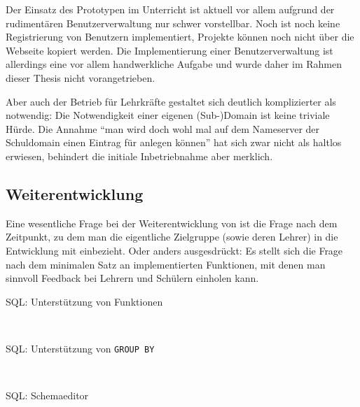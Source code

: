 Der Einsatz des Prototypen im Unterricht ist aktuell vor allem aufgrund der rudimentären Benutzerverwaltung nur schwer vorstellbar. Noch ist noch keine Registrierung von Benutzern implementiert, Projekte können noch nicht über die Webseite kopiert werden. Die Implementierung einer Benutzerverwaltung ist allerdings eine vor allem handwerkliche Aufgabe und wurde daher im Rahmen dieser Thesis nicht vorangetrieben.

Aber auch der Betrieb für Lehrkräfte gestaltet sich deutlich komplizierter als notwendig: Die Notwendigkeit einer eigenen (Sub-)Domain ist keine triviale Hürde. Die Annahme "`man wird doch wohl mal auf dem Nameserver der Schuldomain einen Eintrag für \idename{} anlegen können"' hat sich zwar nicht als haltlos erwiesen, behindert die initiale Inbetriebnahme aber merklich.

\subsection{Weiterentwicklung}

Eine wesentliche Frage bei der Weiterentwicklung von \idename{} ist die Frage nach dem Zeitpunkt, zu dem man die eigentliche Zielgruppe (sowie deren Lehrer) in die Entwicklung mit einbezieht. Oder anders ausgesdrückt: Es stellt sich die Frage nach dem minimalen Satz an implementierten Funktionen, mit denen man sinnvoll Feedback bei Lehrern und Schülern einholen kann.

\begin{description}
\item[SQL: Unterstützung von Funktionen] \hfill\\

\item[SQL: Unterstützung von \texttt{GROUP BY}] \hfill\\

\item[SQL: Schemaeditor] \hfill\\
  
\end{description}



